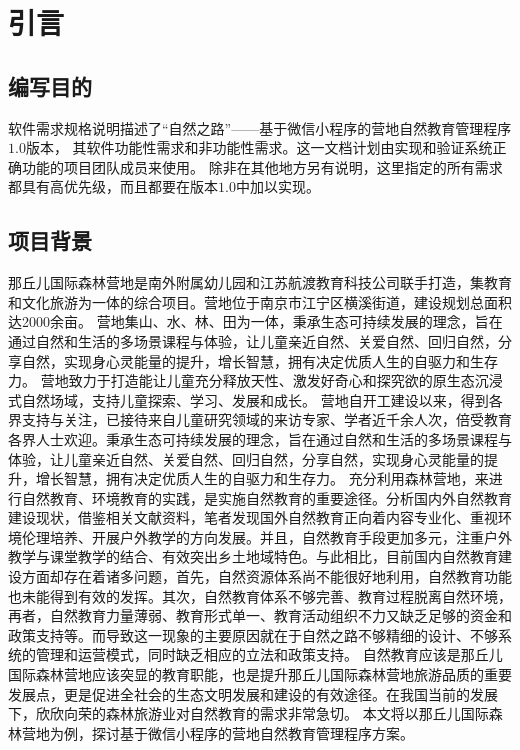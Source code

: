 \section{引言}
\subsection{编写目的}
软件需求规格说明描述了“自然之路”——基于微信小程序的营地自然教育管理程序$1.0$版本，
其软件功能性需求和非功能性需求。这一文档计划由实现和验证系统正确功能的项目团队成员来使用。
除非在其他地方另有说明，这里指定的所有需求都具有高优先级，而且都要在版本$1.0$中加以实现。

\subsection{项目背景}
那丘儿国际森林营地是南外附属幼儿园和江苏航渡教育科技公司联手打造，集教育和文化旅游为一体的综合项目。营地位于南京市江宁区横溪街道，建设规划总面积达2000余亩。
营地集山、水、林、田为一体，秉承生态可持续发展的理念，旨在通过自然和生活的多场景课程与体验，让儿童亲近自然、关爱自然、回归自然，分享自然，实现身心灵能量的提升，增长智慧，拥有决定优质人生的自驱力和生存力。
营地致力于打造能让儿童充分释放天性、激发好奇心和探究欲的原生态沉浸式自然场域，支持儿童探索、学习、发展和成长。
营地自开工建设以来，得到各界支持与关注，已接待来自儿童研究领域的来访专家、学者近千余人次，倍受教育各界人士欢迎。秉承生态可持续发展的理念，旨在通过自然和生活的多场景课程与体验，让儿童亲近自然、关爱自然、回归自然，分享自然，实现身心灵能量的提升，增长智慧，拥有决定优质人生的自驱力和生存力。
充分利用森林营地，来进行自然教育、环境教育的实践，是实施自然教育的重要途径。分析国内外自然教育建设现状，借鉴相关文献资料，笔者发现国外自然教育正向着内容专业化、重视环境伦理培养、开展户外教学的方向发展。并且，自然教育手段更加多元，注重户外教学与课堂教学的结合、有效突出乡土地域特色。与此相比，目前国内自然教育建设方面却存在着诸多问题，首先，自然资源体系尚不能很好地利用，自然教育功能也未能得到有效的发挥。其次，自然教育体系不够完善、教育过程脱离自然环境，再者，自然教育力量薄弱、教育形式单一、教育活动组织不力又缺乏足够的资金和政策支持等。而导致这一现象的主要原因就在于自然之路不够精细的设计、不够系统的管理和运营模式，同时缺乏相应的立法和政策支持。
自然教育应该是那丘儿国际森林营地应该突显的教育职能，也是提升那丘儿国际森林营地旅游品质的重要发展点，更是促进全社会的生态文明发展和建设的有效途径。在我国当前的发展下，欣欣向荣的森林旅游业对自然教育的需求非常急切。
本文将以那丘儿国际森林营地为例，探讨基于微信小程序的营地自然教育管理程序方案。

